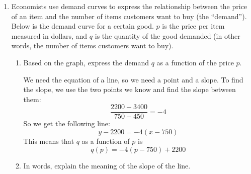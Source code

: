 \documentclass{article}
\begin{document}
\begin{enumerate}
\item  Economists use demand curves to express the relationship between the price of an item and the number of items customers want to buy (the ``demand''). Below is the demand curve for a certain good. $p$ is the price per item measured in dollars, and $q$ is the quantity of the good demanded (in other words, the number of items customers want to buy). 

  \begin{enumerate}
  \item


    \begin{problem}[0.75in]
      Based on the graph, express the demand $q$ as a function of the price $p$.\\
    \end{problem}

    \begin{solution}
      We need the equation of a line, so we need a
      point and a slope. To find the slope, we use the two points we
      know and find the slope between them:
      $$\frac{2200 - 3400}{750 - 450} = -4$$
      So we get the following line:
      $$y - 2200 = -4(x-750)$$
      This means that $q$ as a function of $p$ is
      \[q(p) = -4(p-750)+2200\]
    \end{solution}

  \item
    \begin{problem}[\stretch{0.5}]
      In words, explain the meaning of the slope of the line.
    \end{problem}


\end{enumerate}
\end{enumerate}
\end{document}
